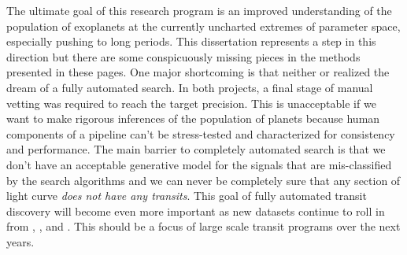 The ultimate goal of this research program is an improved understanding of the
population of exoplanets at the currently uncharted extremes of parameter
space, especially pushing to long periods.
This dissertation represents a step in this direction but there are some
conspicuously missing pieces in the methods presented in these pages.
One major shortcoming is that neither  or  realized
the dream of a fully automated search.
In both projects, a final stage of manual vetting was required to reach the
target precision.
This is unacceptable if we want to make rigorous inferences of the population
of planets because human components of a pipeline can't be stress-tested and
characterized for consistency and performance.
The main barrier to completely automated search is that we don't have an
acceptable generative model for the signals that are mis-classified by the
search algorithms and we can never be completely sure that any section of
light curve \emph{does not have any transits}.
This goal of fully automated transit discovery will become even more important
as new datasets continue to roll in from \KT, \tess, and \plato.
This should be a focus of large scale transit programs over the next years.










